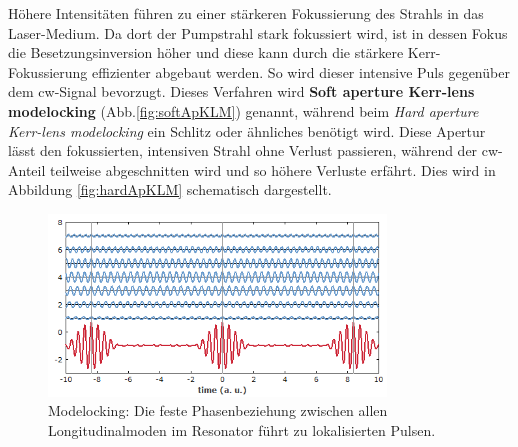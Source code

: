 \documentclass[bachelor,       %
               twoside,        %
               BCOR10mm,       %
               liststotoc,nomtotoc,bibtotoc, %
               english,ngerman, %
               final,          %
               ]{GAUBM}
\begin{document}
Höhere Intensitäten führen zu einer stärkeren Fokussierung des Strahls in das Laser-Medium.
Da dort der Pumpstrahl stark fokussiert wird, ist in dessen Fokus die Besetzungsinversion höher und diese kann durch die stärkere Kerr-Fokussierung effizienter abgebaut werden.
So wird dieser intensive Puls gegenüber dem cw-Signal bevorzugt.
Dieses Verfahren wird \textbf{Soft aperture Kerr-lens modelocking} (Abb.\ref{fig:softApKLM}) genannt, während beim \textit{Hard aperture Kerr-lens modelocking} ein Schlitz oder ähnliches benötigt wird.
Diese Apertur lässt den fokussierten, intensiven Strahl ohne Verlust passieren, während der cw-Anteil teilweise abgeschnitten wird und so höhere Verluste erfährt.
Dies wird in Abbildung \ref{fig:hardApKLM} schematisch dargestellt.
\\
\begin{figure}[!htb]
	\centering
	\includegraphics[width=0.8\textwidth]{figures/ML_pulse_train_synthesis2.png}
	\caption{Modelocking\protect\footnotemark: Die feste Phasenbeziehung zwischen allen \protect\\ Longitudinalmoden im Resonator führt zu lokalisierten Pulsen.}
	\label{fig:ML_RP}
\end{figure}

\end{document}
